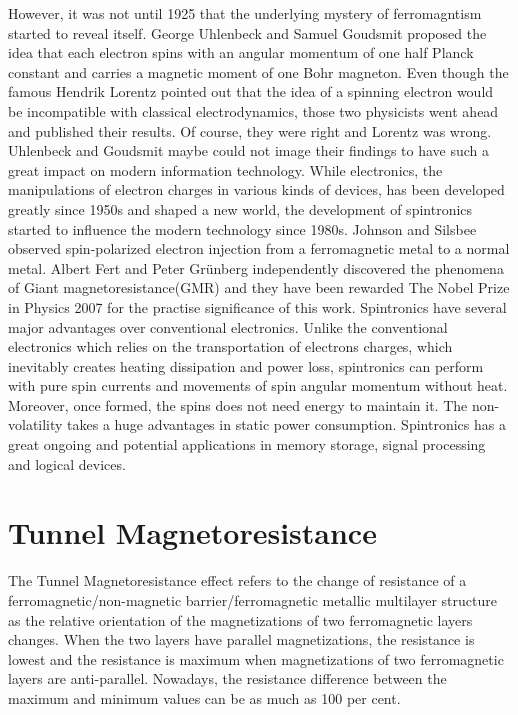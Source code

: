 However, it was not until 1925 that the underlying mystery of ferromagntism started to reveal itself. George Uhlenbeck and Samuel Goudsmit proposed the idea that each electron spins with an angular momentum of one half Planck constant and carries a magnetic moment of one Bohr magneton. Even though the famous Hendrik Lorentz pointed out that the idea of a spinning electron would be incompatible with classical electrodynamics, those two physicists went ahead and published their results. Of course, they were right and Lorentz was wrong. Uhlenbeck and Goudsmit maybe could not image their findings to have such a great impact on modern information technology. While electronics, the manipulations of electron charges in various kinds of devices, has been developed greatly since 1950s and shaped a new world, the development of spintronics started to influence the modern technology since 1980s. Johnson and Silsbee\cite{JohnsonandSilsbee} observed spin-polarized electron injection from a ferromagnetic metal to a normal metal.  Albert Fert\cite{Fert} and Peter Gr\"unberg\cite{Grunberg} independently discovered the phenomena of Giant magnetoresistance(GMR) and they have been rewarded The Nobel Prize in Physics 2007 for the practise significance of this work. Spintronics have several major advantages over conventional electronics. Unlike the conventional electronics which relies on the transportation of electrons charges, which inevitably creates heating dissipation and power loss, spintronics can perform with pure spin currents and movements of spin angular momentum without heat. Moreover, once formed, the spins does not need energy to maintain it. The non-volatility takes a huge advantages in static power consumption. Spintronics has a great ongoing and potential applications in memory storage, signal processing and logical devices.

\section{Tunnel Magnetoresistance}

The Tunnel Magnetoresistance effect\cite{TMR} refers to the change of resistance of a ferromagnetic/non-magnetic barrier/ferromagnetic metallic multilayer structure as the relative orientation of the magnetizations of two ferromagnetic layers changes. When the two layers have parallel magnetizations, the resistance is lowest and the resistance is maximum when magnetizations of two ferromagnetic layers are anti-parallel. Nowadays, the resistance difference between the maximum and minimum values can be as much as 100 per cent.

